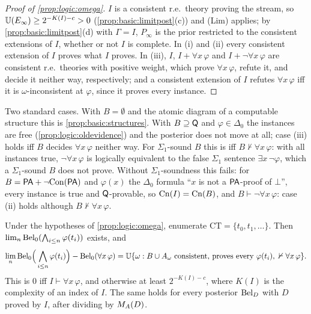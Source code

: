 \begin{proof}[Proof of \cref{prop:logic:omega}]
$I$ is a consistent r.e.\ theory proving the stream, so $\mathbb{U}(E_\infty)\ge2^{-K(I)-c}>0$ (\cref{prop:basic:limitpost}(c)) and (Lim) applies; by \cref{prop:basic:limitpost}(d) with $\Gamma=I$, $P_\infty$ is the prior restricted to the consistent extensions of $I$, whether or not $I$ is complete. In (i) and (ii) every consistent extension of $I$ proves what $I$ proves. In (iii), $I$, $I+\forall x\,\varphi$ and $I+\neg\forall x\,\varphi$ are consistent r.e.\ theories with positive weight, which prove $\forall x\,\varphi$, refute it, and decide it neither way, respectively; and a consistent extension of $I$ refutes $\forall x\,\varphi$ iff it is $\omega$-inconsistent at $\varphi$, since it proves every instance.
\end{proof}

Two standard cases. With $B=\emptyset$ and the atomic diagram of a computable structure this is \cref{prop:basic:structures}. With $B\supseteq\mathsf{Q}$ and $\varphi\in\Delta_0$ the instances are free (\cref{prop:logic:oldevidence}) and the posterior does not move at all; case (iii) holds iff $B$ decides $\forall x\,\varphi$ neither way. For $\Sigma_1$-sound $B$ this is iff $B\nvdash\forall x\,\varphi$: with all instances true, $\neg\forall x\,\varphi$ is logically equivalent to the false $\Sigma_1$ sentence $\exists x\,\neg\varphi$, which a $\Sigma_1$-sound $B$ does not prove. Without $\Sigma_1$-soundness this fails: for $B=\mathsf{PA}+\neg\mathrm{Con}(\mathsf{PA})$ and $\varphi(x)$ the $\Delta_0$ formula ``$x$ is not a $\mathsf{PA}$-proof of $\bot$'', every instance is true and $\mathsf{Q}$-provable, so $\mathrm{Cn}(I)=\mathrm{Cn}(B)$, and $B\vdash\neg\forall x\,\varphi$: case (ii) holds although $B\nvdash\forall x\,\varphi$.

\begin{proposition}\label{prop:logic:gaifman}
Under the hypotheses of \cref{prop:logic:omega}, enumerate $\mathrm{CT}=\{t_0,t_1,\dots\}$. Then $\lim_n\mathrm{Bel}_0(\bigwedge_{i\le n}\varphi(t_i))$ exists, and
\[
\lim_n\mathrm{Bel}_0\Big(\bigwedge_{i\le n}\varphi(t_i)\Big)-\mathrm{Bel}_0(\forall x\,\varphi)=\mathbb{U}\{\omega:B\cup A_\omega\text{ consistent, proves every }\varphi(t_i),\ \nvdash\forall x\,\varphi\}.
\]
This is $0$ iff $I\vdash\forall x\,\varphi$, and otherwise at least $2^{-K(I)-c}$, where $K(I)$ is the complexity of an index of $I$. The same holds for every posterior $\mathrm{Bel}_D$ with $D$ proved by $I$, after dividing by $M_{A}(D)$.
\end{proposition}

